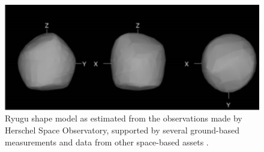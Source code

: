 \begin{figure}[htb]
\centering
\captionsetup{justification=centering}
\includegraphics[width=\linewidth, height=0.3\textheight, keepaspectratio=true]{ryugu_shape.pdf}
\caption{Ryugu shape model as estimated from the observations made by Herschel Space Observatory, supported by several ground-based measurements and data from other space-based assets \parencite{ryuguShapeModel}.}
\label{fig:ryugu_shape}
\end{figure}
\FloatBarrier

